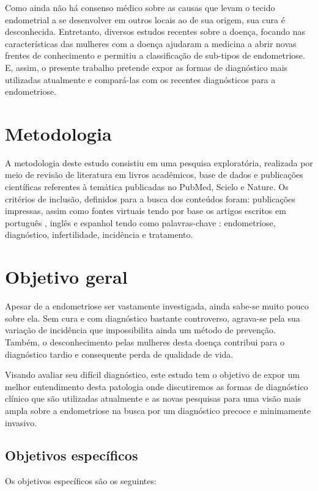 \documentclass[12pt]{article} %
\begin{document}
Como ainda não há consenso médico sobre as causas que levam o tecido
endometrial a se desenvolver em outros locais ao de sua origem, sua
cura é desconhecida. Entretanto, diversos estudos recentes sobre a
doença, focando nas características das mulheres com a doença ajudaram
a medicina a abrir novas frentes de conhecimento e permitiu a
classificação de sub-tipos de endometriose. E, assim, o presente
trabalho pretende expor as formas de diagnóstico mais utilizadas
atualmente e compará-las com os recentes diagnósticos para a
endometriose.

\section{Metodologia}

A metodologia deste estudo consistiu em uma pesquisa exploratória, realizada por meio de revisão de literatura em livros acadêmicos, base de dados e publicações científicas referentes à temática publicadas no PubMed, Scielo e Nature. Os critérios de inclusão, definidos para a busca dos conteúdos foram: publicações impressas, assim como fontes virtuais tendo por base os artigos escritos em português , inglês e espanhol tendo como palavras-chave : endometriose, diagnóstico, infertilidade, incidência e tratamento.


\section{Objetivo geral}

Apesar de a endometriose ser vastamente investigada, ainda sabe-se
muito pouco sobre ela. Sem cura e com diagnóstico bastante controverso,
agrava-se pela sua variação de incidência que impossibilita ainda um
método de prevenção. Também, o desconhecimento pelas mulheres desta
doença contribui para o diagnóstico tardio e consequente perda de
qualidade de vida.

Visando avaliar seu difícil diagnóstico, este estudo tem o objetivo de
expor um melhor entendimento desta patologia onde discutiremos as
formas de diagnóstico clínico que são utilizadas atualmente e as novas
pesquisas para uma visão mais ampla sobre a endometriose na busca por
um diagnóstico precoce e minimamente invasivo.
\newpage
\subsection{Objetivos específicos}

Os objetivos específicos são os seguintes:
\end{document}
